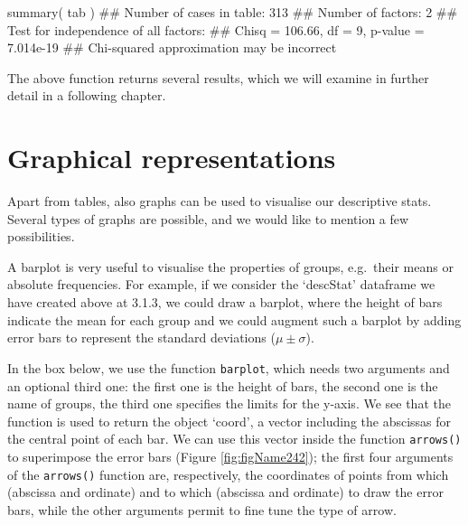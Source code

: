 \documentclass[a4paper,12pt,oneside]{book}
\newenvironment{Shaded}{\begin{snugshade}}{\end{snugshade}}
\newcommand{\DocumentationTok}[1]{#1}
\newcommand{\FunctionTok}[1]{#1}
\newcommand{\NormalTok}[1]{#1}
\begin{document}
\begin{Shaded}
\begin{Highlighting}[]
\FunctionTok{summary}\NormalTok{( tab )}
\DocumentationTok{\#\# Number of cases in table: 313 }
\DocumentationTok{\#\# Number of factors: 2 }
\DocumentationTok{\#\# Test for independence of all factors:}
\DocumentationTok{\#\#  Chisq = 106.66, df = 9, p{-}value = 7.014e{-}19}
\DocumentationTok{\#\#  Chi{-}squared approximation may be incorrect}
\end{Highlighting}
\end{Shaded}

The above function returns several results, which we will examine in further detail in a following chapter.

\hypertarget{graphical-representations}{%
\section{Graphical representations}\label{graphical-representations}}

Apart from tables, also graphs can be used to visualise our descriptive stats. Several types of graphs are possible, and we would like to mention a few possibilities.

A barplot is very useful to visualise the properties of groups, e.g.~their means or absolute frequencies. For example, if we consider the `descStat' dataframe we have created above at 3.1.3, we could draw a barplot, where the height of bars indicate the mean for each group and we could augment such a barplot by adding error bars to represent the standard deviations (\(\mu \pm \sigma\)).

In the box below, we use the function \texttt{barplot}, which needs two arguments and an optional third one: the first one is the height of bars, the second one is the name of groups, the third one specifies the limits for the y-axis. We see that the function is used to return the object `coord', a vector including the abscissas for the central point of each bar. We can use this vector inside the function \texttt{arrows()} to superimpose the error bars (Figure \ref{fig:figName242}); the first four arguments of the \texttt{arrows()} function are, respectively, the coordinates of points from which (abscissa and ordinate) and to which (abscissa and ordinate) to draw the error bars, while the other arguments permit to fine tune the type of arrow.
\end{document}
